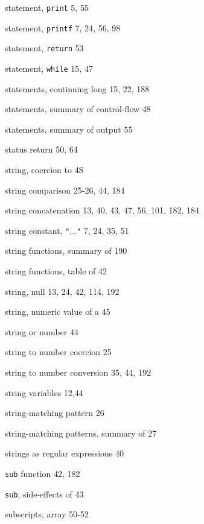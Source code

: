 \begin{multicols}{3}
\hangindent=3pc  statement, \verb'print' 5, 55

\hangindent=3pc  statement, \verb'printf' 7, 24, 56, 98

\hangindent=3pc  statement, \verb'return' 53

\hangindent=3pc  statement, \verb'while' 15, 47

\hangindent=3pc  statements, continuing long 15, 22, 188

\hangindent=3pc  statements, summary of control-flow 48

\hangindent=3pc  statements, summary of output 55

\hangindent=3pc  status return 50, 64

\hangindent=3pc  string, coercion to 4S

\hangindent=3pc  string comparison 25-26, 44, 184

\hangindent=3pc  string concatenation 13, 40, 43,  47, 56, 101, 182, 184

\hangindent=3pc  string constant, \verb'"'...\verb'"' 7, 24, 35, 51

\hangindent=3pc  string functions, summary of 190

\hangindent=3pc  string functions, table of 42

\hangindent=3pc  string, null 13, 24, 42, 114, 192

\hangindent=3pc  string, numeric value of a 45

\hangindent=3pc  string or number 44

\hangindent=3pc  string to number coercion 25

\hangindent=3pc  string to number conversion 35, 44, 192

\hangindent=3pc  string variables 12,44

\hangindent=3pc  string-matching pattern 26

\hangindent=3pc  string-matching patterns, summary of 27

\hangindent=3pc  strings as regular expressions 40

\hangindent=3pc  \verb'sub' function 42, 182

\hangindent=3pc  \verb'sub', side-effects of 43

\hangindent=3pc  subscripts, array 50-52


\end{multicols}
